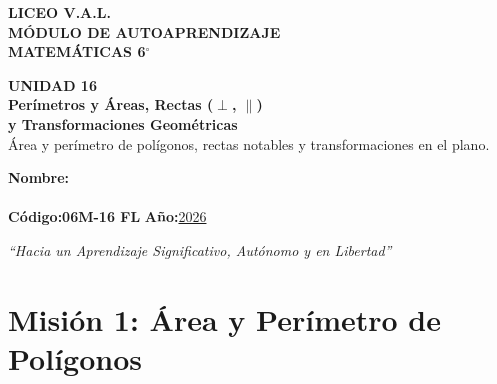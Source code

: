 \documentclass[12pt, letterpaper]{article}
\begin{document}
	
	\begin{center}
		{\Huge\textbf{LICEO V.A.L.}}\\[0.5cm]
		{\LARGE\textbf{MÓDULO DE AUTOAPRENDIZAJE}}\\[0.5cm]
		{\Large\textbf{MATEMÁTICAS 6$^\circ$}}\\[0.5cm]
		\begin{tcolorbox}[colback=valblue!10, colframe=valblue,
			arc=3mm, boxrule=1.5pt]
			\centering
			\Huge\textbf{UNIDAD 16}\\[0.25cm]
			\Large\textbf{Perímetros y Áreas, Rectas ($\perp$, $\parallel$)}\\[0.1cm]
			\Large\textbf{y Transformaciones Geométricas}\\[0.2cm]
			\large Área y perímetro de polígonos, rectas notables y transformaciones en el plano.
		\end{tcolorbox}
		\vspace{0.6cm}
		\begin{tcolorbox}[colback=white, colframe=valblue,
			width=12cm, arc=3mm, boxrule=1.5pt]
			\centering\vspace{0.3cm}
			\textbf{Nombre:}\\[0.3cm]
			\underline{\hspace{9cm}}\\[0.5cm]
			\textbf{Código:}\;\textbf{06M-16 FL}
			\hspace{1cm}\textbf{Año:}\;\underline{2026}
			\vspace{0.3cm}
		\end{tcolorbox}
		\vspace{0.8cm}
		\textit{``Hacia un Aprendizaje Significativo, Autónomo y en Libertad''}
	\end{center}
	
	\section*{Misión 1: Área y Perímetro de Polígonos}
	
\end{document}

